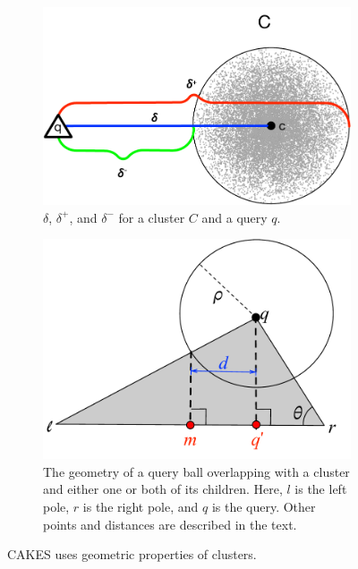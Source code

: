 \begin{figure}[ht!]
    \begin{subfigure}{.5\textwidth}
        \centering
        \includegraphics[scale=0.4]{images/geometry/deltas.pdf}
        \caption{{\color{blue}$\delta$}, {\color{red}$\delta^{+}$}, and {\color{green}$\delta^{-}$} for a cluster $C$ and a query $q$.}
        \label{fig:methods:deltas}
      \end{subfigure}%
      \begin{subfigure}{.5\textwidth}
        \centering
        \includegraphics[scale=0.4]{images/geometry/overlapping-children-3.pdf}
        \caption{The geometry of a query ball overlapping with a cluster and either one or both of its children. Here, $l$ is the left pole, $r$ is the right pole, and $q$ is the query. Other points and distances are described in the text.}
        \label{fig:methods:overlapping-children}
      \end{subfigure}%
    \caption{CAKES uses geometric properties of clusters.}
\end{figure}

